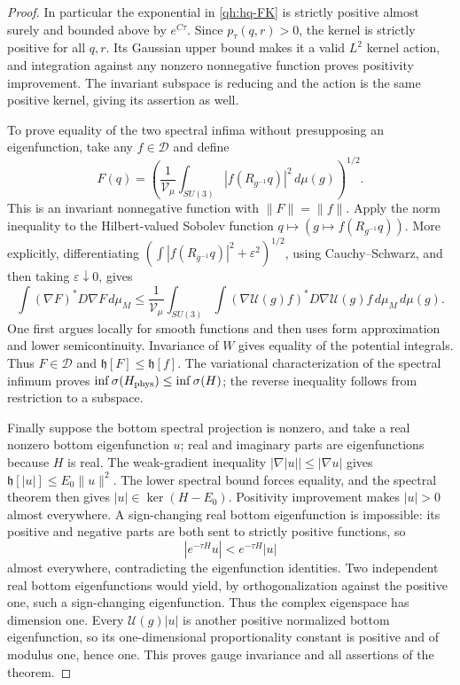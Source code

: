 \begin{proof}
In particular the exponential in \eqref{qh:hq-FK} is strictly
positive almost surely and bounded above by \(e^{C\tau}\).
Since \(p_\tau(q,r)>0\), the kernel is strictly positive for all
\(q,r\). Its Gaussian upper bound makes it a valid \(L^2\)
kernel action, and integration against any nonzero nonnegative
function proves positivity improvement. The invariant subspace
is reducing and the action is the same positive kernel, giving
its assertion as well.

To prove equality of the two spectral infima without presupposing
an eigenfunction, take any \(f\in\mathscr D\) and define
\[
 F(q)=\left(\frac1{\mathcal V_\mu}
       \int_{SU(3)}|f(R_{g^{-1}}q)|^2\,d\mu(g)\right)^{1/2}.
\]
This is an invariant nonnegative function with \(\|F\|=\|f\|\).
Apply the norm inequality to the Hilbert-valued Sobolev function
\(q\mapsto(g\mapsto f(R_{g^{-1}}q))\). More explicitly, differentiating
\((\int|f(R_{g^{-1}}q)|^2+\varepsilon^2)^{1/2}\), using
Cauchy--Schwarz, and then taking \(\varepsilon\downarrow0\), gives
\[
 \int(\nabla F)^*D\nabla F\,d\mu_M
 \leq \frac1{\mathcal V_\mu}\int_{SU(3)}
       \int(\nabla\mathcal U(g)f)^*D
                           \nabla\mathcal U(g)f\,d\mu_M\,d\mu(g).
\]
One first argues locally for smooth functions and then uses form
approximation and lower semicontinuity. Invariance of \(W\) gives
equality of the potential integrals. Thus \(F\in\mathscr D\) and
\(\mathfrak h[F]\leq\mathfrak h[f]\). The variational
characterization of the spectral infimum proves
\(\inf\sigma(H_{\rm phys})\leq\inf\sigma(H)\); the reverse inequality
follows from restriction to a subspace.

Finally suppose the bottom spectral projection is nonzero, and take
a real nonzero bottom eigenfunction \(u\); real and imaginary parts
are eigenfunctions because \(H\) is real. The weak-gradient inequality
\(|\nabla|u||\leq|\nabla u|\) gives
\(\mathfrak h[|u|]\leq E_0\|u\|^2\). The lower spectral bound forces
equality, and the spectral theorem then gives
\(|u|\in\ker(H-E_0)\). Positivity improvement makes \(|u|>0\)
almost everywhere. A sign-changing real bottom eigenfunction is
impossible: its positive and negative parts are both sent to
strictly positive functions, so
\[
 |e^{-\tau H}u|<e^{-\tau H}|u|
\]
almost everywhere, contradicting the eigenfunction identities.
Two independent real bottom eigenfunctions would yield, by
orthogonalization against the positive one, such a sign-changing
eigenfunction. Thus the complex eigenspace has dimension one.
Every \(\mathcal U(g)|u|\) is another positive normalized bottom
eigenfunction, so its one-dimensional proportionality constant
is positive and of modulus one, hence one. This proves gauge
invariance and all assertions of the theorem.
\end{proof}

